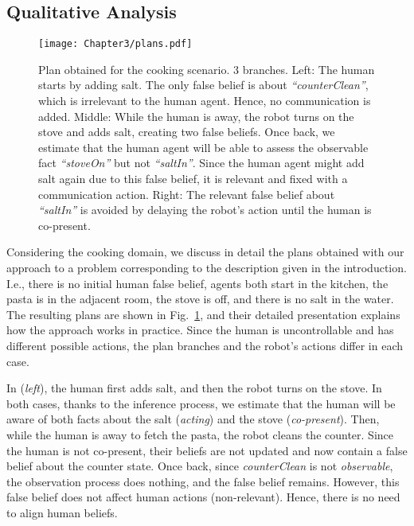 {\subsection{Qualitative Analysis}

\begin{figure}[t!]
    \centering
    \texttt{[image: Chapter3/plans.pdf]}
    \caption{
    Plan obtained for the cooking scenario. 3 branches. Left: The human starts by adding salt. The only false belief is about \textit{``counterClean''}, which is irrelevant to the human agent. Hence, no communication is added. Middle: While the human is away, the robot turns on the stove and adds salt, creating two false beliefs. 
    Once back, we estimate that the human agent
    will be able to assess the observable fact \textit{``stoveOn''} but not \textit{``saltIn''}. Since the human agent might add salt again due to this false belief, it is relevant and fixed with a communication action. Right: The relevant false belief about \textit{``saltIn''} is avoided by delaying the robot's action until the human is co-present.
    }
    \label{fig:cooking_plan}
\end{figure}

Considering the cooking domain, we discuss in detail the plans obtained with our approach to a problem corresponding to the description given in the introduction. 
I.e., there is no initial human false belief, agents both start in the kitchen, the pasta is in the adjacent room, the stove is off, and there is no salt in the water. The resulting plans are shown in Fig.~\ref{fig:cooking_plan}, and their detailed presentation explains how the approach works in practice. 
Since the human is uncontrollable and has different possible actions, the plan branches and the robot's actions differ in each case. 

In (\textit{left}), the human first adds salt, and then the robot turns on the stove. In both cases, thanks to the inference process, we estimate that the human will be aware of both facts about the salt (\textit{acting}) and the stove (\textit{co-present}). Then, while the human is away to fetch the pasta, the robot cleans the counter. Since the human is not co-present, their beliefs are not updated and now contain a false belief about the counter state. Once back, since \textit{counterClean} is not \textit{observable}, the observation process does nothing, and the false belief remains. However, this false belief does not affect human actions (non-relevant). Hence, there is no need to align human beliefs.

}
